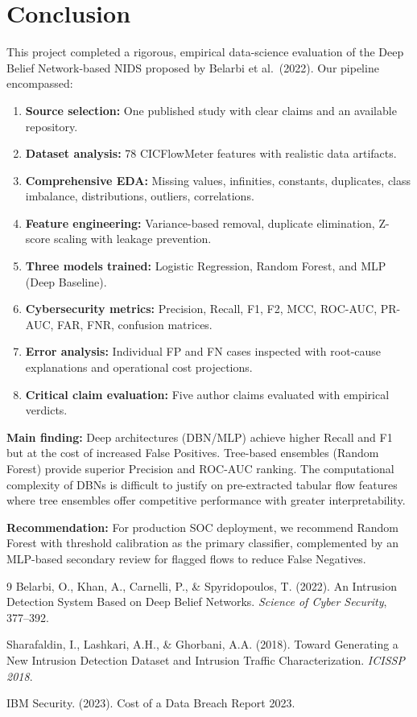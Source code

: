 \documentclass[11pt,a4paper]{article}
\begin{document}
\section{Conclusion}

This project completed a rigorous, empirical data-science evaluation of the Deep Belief Network-based NIDS proposed by Belarbi et al.\ (2022). Our pipeline encompassed:

\begin{enumerate}[nosep]
    \item \textbf{Source selection:} One published study with clear claims and an available repository.
    \item \textbf{Dataset analysis:} 78 CICFlowMeter features with realistic data artifacts.
    \item \textbf{Comprehensive EDA:} Missing values, infinities, constants, duplicates, class imbalance, distributions, outliers, correlations.
    \item \textbf{Feature engineering:} Variance-based removal, duplicate elimination, Z-score scaling with leakage prevention.
    \item \textbf{Three models trained:} Logistic Regression, Random Forest, and MLP (Deep Baseline).
    \item \textbf{Cybersecurity metrics:} Precision, Recall, F1, F2, MCC, ROC-AUC, PR-AUC, FAR, FNR, confusion matrices.
    \item \textbf{Error analysis:} Individual FP and FN cases inspected with root-cause explanations and operational cost projections.
    \item \textbf{Critical claim evaluation:} Five author claims evaluated with empirical verdicts.
\end{enumerate}

\textbf{Main finding:} Deep architectures (DBN/MLP) achieve higher Recall and F1 but at the cost of increased False Positives. Tree-based ensembles (Random Forest) provide superior Precision and ROC-AUC ranking. The computational complexity of DBNs is difficult to justify on pre-extracted tabular flow features where tree ensembles offer competitive performance with greater interpretability.

\textbf{Recommendation:} For production SOC deployment, we recommend Random Forest with threshold calibration as the primary classifier, complemented by an MLP-based secondary review for flagged flows to reduce False Negatives.

\begin{thebibliography}{9}
Belarbi, O., Khan, A., Carnelli, P., \& Spyridopoulos, T. (2022). An Intrusion Detection System Based on Deep Belief Networks. \textit{Science of Cyber Security}, 377--392.

Sharafaldin, I., Lashkari, A.H., \& Ghorbani, A.A. (2018). Toward Generating a New Intrusion Detection Dataset and Intrusion Traffic Characterization. \textit{ICISSP 2018}.

IBM Security. (2023). Cost of a Data Breach Report 2023.
\end{thebibliography}
\end{document}
